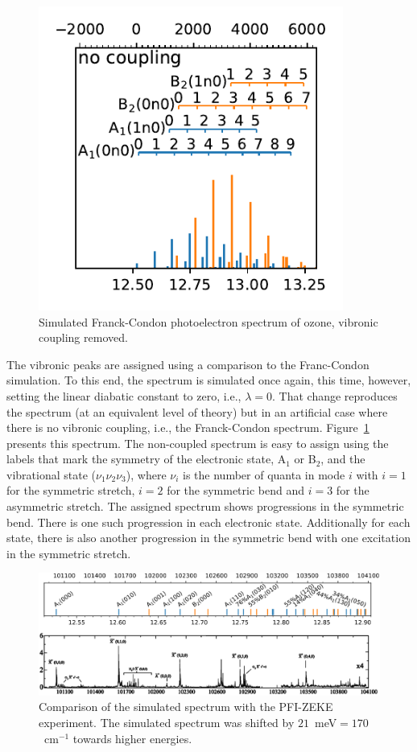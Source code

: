 \documentclass[
12pt,
a4paper,
prb,
superscriptaddress,
]{revtex4}
\begin{document}
\begin{figure}
    \includegraphics[width=10cm]{figures/spectrum_assigned.pdf}
    \caption{
        Simulated Franck-Condon photoelectron spectrum of ozone, vibronic
        coupling removed.
    }
    \label{fig:no_coupling}
\end{figure}

The vibronic peaks are assigned using a comparison to the Franc-Condon
simulation.  To this end, the spectrum is simulated once again, this time,
however, setting the linear diabatic constant to zero, i.e., $\lambda = 0$.
That change reproduces the spectrum (at an equivalent level of theory) but in
an artificial case where there is no vibronic coupling, i.e., the
Franck-Condon spectrum.  Figure~\ref{fig:no_coupling} presents this spectrum.
The non-coupled spectrum is easy to assign using the labels that mark the
symmetry of the electronic state, A$_1$ or B$_2$, and the vibrational state
($\nu _1 \nu_2 \nu_3$), where $\nu _i$ is the number of quanta in mode $i$
with $i=1$ for the symmetric stretch, $i=2$ for the symmetric bend and $i=3$
for the asymmetric stretch.  The assigned spectrum shows progressions in the
symmetric bend. There is one such progression in each electronic state.
Additionally for each state, there is also another progression in the
symmetric bend with one excitation in the symmetric stretch.

\begin{figure}
    \includegraphics[width=16 cm]{./figures/sim_vs_zeke}
    \caption{
        Comparison of the simulated spectrum with the PFI-ZEKE
        experiment.\cite{Willitsch:O3ZEKE:2005} The simulated spectrum was
        shifted by $21$~meV$ = 170$~cm$^{-1}$ towards higher energies.
    }
    \label{fig:sim_vs_zeke}
\end{figure}
\end{document}
